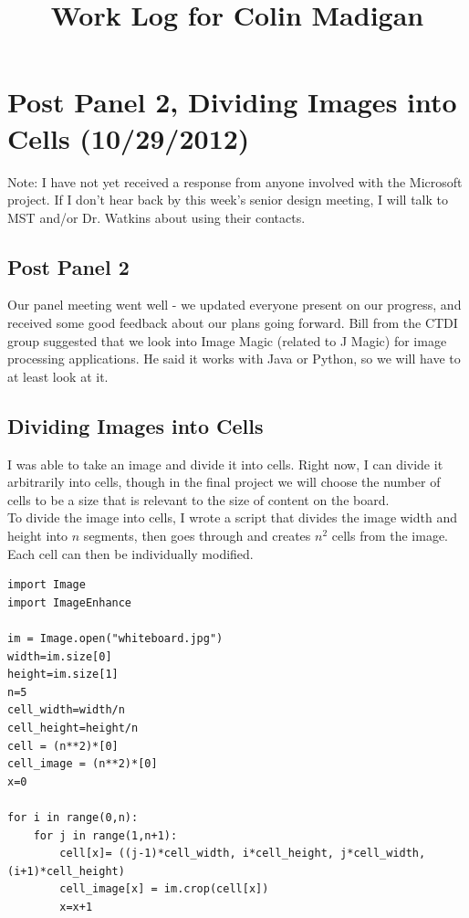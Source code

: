\documentclass[]{article}
\begin{document}
\title{Work Log for Colin Madigan}
\date{}
\maketitle
	\tableofcontents

	\section{Post Panel 2, Dividing Images into Cells (10/29/2012)}
	Note:  I have not yet received a response from anyone involved with the Microsoft project.  If I don't hear back by this week's senior design meeting, I will talk to MST and/or Dr. Watkins about using their contacts.
		\subsection*{Post Panel 2}
	Our panel meeting went well - we updated everyone present on our progress, and received some good feedback about our plans going forward.  Bill from the CTDI group suggested that we look into Image Magic (related to J Magic) for image processing applications.  He said it works with Java or Python, so we will have to at least look at it.  
		\subsection*{Dividing Images into Cells}
	I was able to take an image and divide it into cells.  Right now, I can divide it arbitrarily into  cells, though in the final project we will choose the number of cells to be a size that is relevant to the size of content on the board.  \\
	To divide the image into cells, I wrote a script that divides the image width and height into $n$ segments, then goes through and creates $n^2$ cells from the image.  Each cell can then be individually modified.
	
\begin{verbatim}
import Image
import ImageEnhance

im = Image.open("whiteboard.jpg")
width=im.size[0]
height=im.size[1]
n=5
cell_width=width/n
cell_height=height/n
cell = (n**2)*[0]
cell_image = (n**2)*[0]
x=0

for i in range(0,n):
    for j in range(1,n+1):
        cell[x]= ((j-1)*cell_width, i*cell_height, j*cell_width, (i+1)*cell_height)
        cell_image[x] = im.crop(cell[x])
        x=x+1
\end{verbatim}
	
\end{document}
